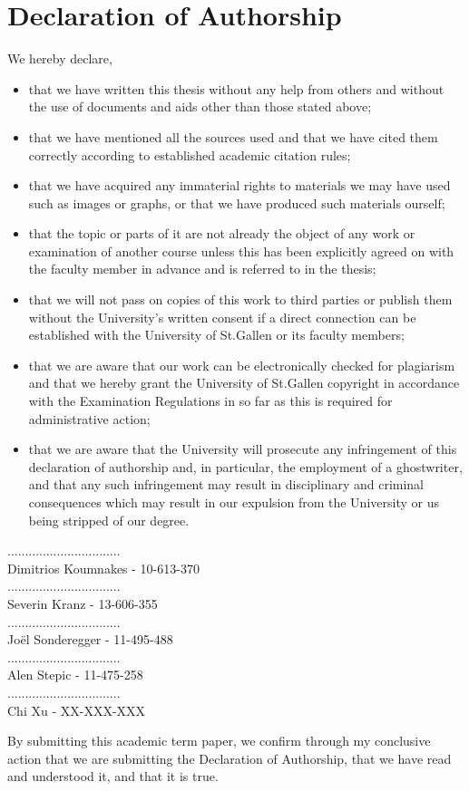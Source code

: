 \documentclass[a4paper,american,12pt]{article}
\begin{document}
\section{Declaration of Authorship}
We hereby declare,
\begin{itemize}
\item that we have written this thesis without any help from others and without the use of documents and aids other than those stated above;
\item that we have mentioned all the sources used and that we have cited them correctly according to established academic citation rules;
\item that we have acquired any immaterial rights to materials we may have used such as images or graphs, or that we have produced such materials ourself;
\item that the topic or parts of it are not already the object of any work or examination of another course unless this has been explicitly agreed on with the faculty member in advance and is referred to in the thesis;
\item that we will not pass on copies of this work to third parties or publish them without the University’s written consent if a direct connection can be established with the University of St.Gallen or its faculty members;
\item that we are aware that our work can be electronically checked for plagiarism and that we hereby grant the University of St.Gallen copyright in accordance with the Examination Regulations in so far as this is required for administrative action;
\item that we are aware that the University will prosecute any infringement of this declaration of authorship and, in particular, the employment of a ghostwriter, and that any such infringement may result in disciplinary and criminal consequences which may result in our expulsion from the University or us being stripped of our degree.
\end{itemize}

\begin{flushleft}
................................\\
Dimitrios Koumnakes - 10-613-370\\\bigskip\bigskip 
................................\\
Severin Kranz - 13-606-355\\\bigskip\bigskip
................................\\
Joël Sonderegger - 11-495-488\\\bigskip\bigskip
................................\\
Alen Stepic - 11-475-258\\\bigskip\bigskip
................................\\
Chi Xu - XX-XXX-XXX

By submitting this academic term paper, we confirm through my conclusive action that we are submitting the Declaration of Authorship, that we have read and understood it, and that it is true.
\end{flushleft}

\clearpage
\end{document}
